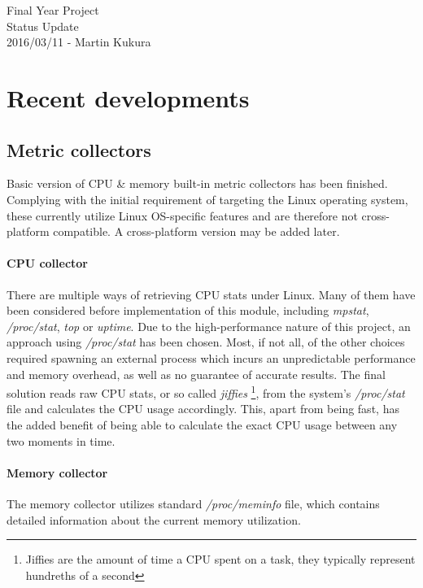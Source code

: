 \documentclass[12pt,a4paper,table]{article}
\begin{document}
    \begin{center}
        \Huge{Final Year Project}\\
        \LARGE{Status Update}\\
        \large{2016/03/11 - Martin Kukura}\\
    \end{center}


    \section{Recent developments}
        \subsection{Metric collectors}
            Basic version of CPU \& memory built-in metric collectors has been finished. Complying with the initial requirement of targeting the Linux operating system, these currently utilize Linux OS-specific features and are therefore not cross-platform compatible. A cross-platform version may be added later.

            \paragraph{CPU collector}
                There are multiple ways of retrieving CPU stats under Linux. Many of them have been considered before implementation of this module, including \textit{mpstat}, \textit{/proc/stat}, \textit{top} or \textit{uptime}. Due to the high-performance nature of this project, an approach using \textit{/proc/stat} has been chosen. Most, if not all, of the other choices required spawning an external process which incurs an unpredictable performance and memory overhead, as well as no guarantee of accurate results. The final solution reads raw CPU stats, or so called \textit{jiffies} \footnote{Jiffies are the amount of time a CPU spent on a task, they typically represent hundreths of a second}, from the system's \textit{/proc/stat} file and calculates the CPU usage accordingly. This, apart from being fast, has the added benefit of being able to calculate the exact CPU usage between any two moments in time.

            \paragraph{Memory collector}
                The memory collector utilizes standard \textit{/proc/meminfo} file, which contains detailed information about the current memory utilization.
\end{document}
